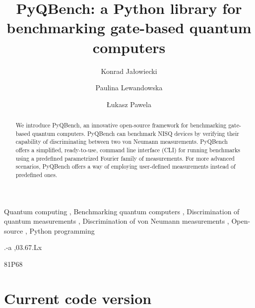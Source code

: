 \documentclass[preprint,12pt, a4paper, dvipsnames]{elsarticle}
\newcommand{\1}{{\rm 1\hspace{-0.9mm}l}}
\theoremstyle{definition}
\begin{document}
\begin{frontmatter}

\title{PyQBench: a Python library for benchmarking gate-based quantum computers}

\author{Konrad Jałowiecki}

\author{Paulina Lewandowska}
\author{\L ukasz Pawela}

\address{Institute of Theoretical and Applied Informatics, Polish Academy
	of Sciences, Ba{\l}tycka~5, 44-100 Gliwice, Poland}

\begin{abstract}

We introduce PyQBench, an innovative open-source framework for benchmarking
gate-based quantum computers. PyQBench can benchmark NISQ devices by verifying their capability of
discriminating between two von Neumann measurements. PyQBench offers a simplified, ready-to-use,
command line interface (CLI) for running benchmarks using a predefined parametrized Fourier
family of measurements. For more advanced scenarios, PyQBench offers a way of employing user-defined
measurements instead of predefined ones.

\end{abstract}

\begin{keyword}
Quantum computing \sep
Benchmarking quantum computers \sep
Discrimination of quantum measurements \sep
Discrimination of von Neumann measurements \sep
Open-source \sep
Python programming

.-a \sep 03.67.Lx

\MSC 81P68

\end{keyword}

\end{frontmatter}

\section*{Current code version}
\label{}
\end{document}
